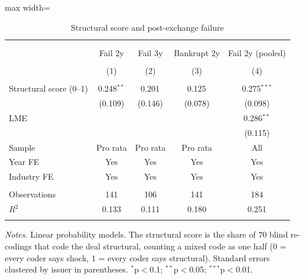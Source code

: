 \begin{table}[!htbp] \centering
  \caption{Structural score and post-exchange failure}
\begin{adjustbox}{max width=\textwidth}
\begin{tabular}{@{\extracolsep{5pt}}lcccc}
\\[-1.8ex]\hline
\hline \\[-1.8ex]
\\[-1.8ex] & \multicolumn{1}{c}{Fail 2y} & \multicolumn{1}{c}{Fail 3y} & \multicolumn{1}{c}{Bankrupt 2y} & \multicolumn{1}{c}{Fail 2y (pooled)}  \\
\\[-1.8ex] & (1) & (2) & (3) & (4) \\
\hline \\[-1.8ex]
 Structural score (0--1) & 0.248$^{**}$ & 0.201$^{}$ & 0.125$^{}$ & 0.275$^{***}$ \\
& (0.109) & (0.146) & (0.078) & (0.098) \\
 LME &  &  &  & 0.286$^{**}$ \\
&  &  &  & (0.115) \\
 Sample & Pro rata & Pro rata & Pro rata & All \\
 Year FE & Yes & Yes & Yes & Yes \\
 Industry FE & Yes & Yes & Yes & Yes \\
\hline \\[-1.8ex]
 Observations & 141 & 106 & 141 & 184 \\
 $R^2$ & 0.133 & 0.111 & 0.180 & 0.251 \\
\hline
\hline \\[-1.8ex]
\end{tabular}
\end{adjustbox}
\label{tab:reg_part1}
\begin{minipage}{0.95\textwidth}\vspace{4pt}\footnotesize
\textit{Notes.} Linear probability models. The structural score is the share of 70 blind re-codings that code the deal structural, counting a mixed code as one half (0 = every coder says shock, 1 = every coder says structural). Standard errors clustered by issuer in parentheses. $^{*}$p$<$0.1; $^{**}$p$<$0.05; $^{***}$p$<$0.01.
\end{minipage}
\end{table}
